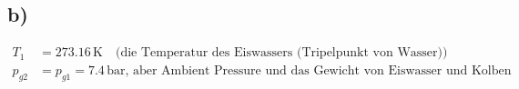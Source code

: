 

\subsection*{b)}
\begin{align*}
T_1 &= 273.16 \, \text{K} \quad \text{(die Temperatur des Eiswassers (Tripelpunkt von Wasser))} \\
p_{g2} &= p_{g1} = 7.4 \, \text{bar, aber Ambient Pressure und das Gewicht von Eiswasser und Kolben bleiben unverändert.}
\end{align*}